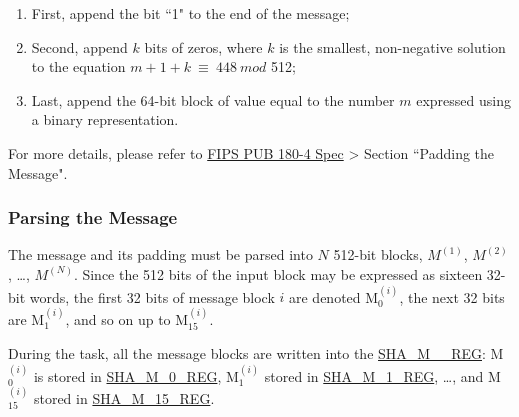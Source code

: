 \documentclass[main\_\_EN.tex]{subfiles}
\begin{document}
\begin{enumerate}
    \item First, append the bit ``1" to the end of the message;
    \item Second, append \begin{math} k \end{math} bits of zeros, where \begin{math} k \end{math} is the smallest, non-negative solution to the equation \begin{math}m + 1 + k \ {\equiv} \ 448 \ mod \end{math} 512;
    \item Last, append the 64-bit block of value equal to the number \begin{math} m \end{math} expressed using a binary representation.
\end{enumerate}

For more details, please refer to \href{https://doi.org/10.6028/NIST.FIPS.180-4}{FIPS PUB 180-4 Spec} > Section ``Padding the Message".

\subsubsection{Parsing the Message}\label{sec:sha-parsing-message}

The message and its padding must be parsed into \begin{math}N\end{math} 512-bit blocks, \begin{math}M^{(1)}\end{math}, \begin{math}M^{(2)}\end{math}, \dots, \begin{math}M^{(N)}\end{math}. Since the 512 bits of the input block may be expressed as sixteen 32-bit words, the first 32 bits of message block \begin{math}i\end{math} are denoted M$^{(i)}_{0}$, the next 32 bits are M$^{(i)}_{1}$, and so on up to M$^{(i)}_{15}$.

During the task, all the message blocks are written into the \hyperref[regdesc:SHAMNREG]{SHA\_M\_\_REG}: M$^{(i)}_{0}$ is stored in \hyperref[regdesc:SHAMNREG]{SHA\_M\_0\_REG}, M$^{(i)}_1$ stored in \hyperref[regdesc:SHAMNREG]{SHA\_M\_1\_REG}, \dots, and M$^{(i)}_{15}$ stored in \hyperref[regdesc:SHAMNREG]{SHA\_M\_15\_REG}.
\end{document}
